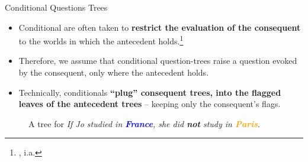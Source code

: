 \documentclass[10pt]{beamer}
\newcommand{\stronger}[1]{\textbf{\textcolor{orange}{#1}}}
\newcommand{\weaker}[1]{\textbf{\textcolor{blue}{#1}}}
\newcommand{\Paris}{\textbf{\textcolor{orange}{Paris}}}
\newcommand{\France}{\textbf{\textcolor{blue}{France}}}
\let\oldcaption=\caption
\renewcommand{\caption}[1][]{\oldcaption{\centering #1}}
\newcommand{\footciteia}[1]{\footnote{\cite{#1}, i.a.}}
\begin{document}
\begin{frame}{Conditional Questions Trees}
	\begin{minipage}{.55\linewidth}
		\begin{itemize}
			\item Conditional are often taken to \textbf{restrict the evaluation of the consequent} to the worlds in which the antecedent holds.\footciteia{Lewis1975,Heim1982,Kratzer1986,Kratzer1991}
			\item Therefore, we assume that conditional question-trees raise a question evoked by the consequent, only where the antecedent holds.
			\item Technically, conditionals \textbf{``plug'' consequent trees, into the flagged leaves of the antecedent trees} -- keeping only the consequent's flags.
		\end{itemize}
	\end{minipage}\hfill
	\begin{minipage}{.4\linewidth}
		\centering
		\begin{figure}[H]
			\centering
			\begin{minipage}{\linewidth}
				\centering
				\scalebox{.8}{
					\begin{forest}
						[CS[\xcancel{\faFlagCheckered}\\\France][\weaker{Italy}][\weaker{...}]]
				\end{forest}}
			\end{minipage}
			\begin{minipage}{\linewidth}
				\centering
				\scalebox{.8}{
				\begin{forest}
					[{CS$\cap$\France}[{\stronger{Paris}}][{\faFlagCheckered\\\stronger{Lyon}}][{\faFlagCheckered\\\stronger{...}}]]
					\draw[->] (0, .5) to[out=north, in=south] (-1, 1.2);
			\end{forest}}
		\end{minipage}\vspace{-3mm}
			\caption{A tree for \textit{If Jo studied in \France, she did \textbf{not} study in \Paris}.}
		\end{figure}
	\end{minipage}
\end{frame}
\end{document}
